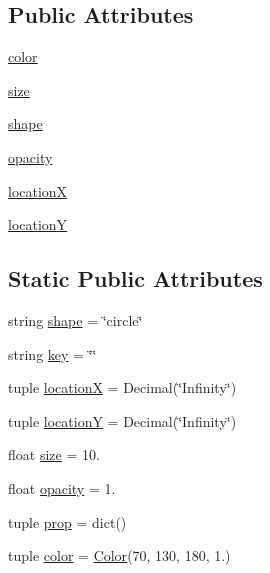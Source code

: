 \subsection*{Public Attributes}
\begin{DoxyCompactItemize}
\item 
\hyperlink{classbridges_1_1element__visualizer_1_1_element_visualizer_a1fd985698e1c56289ed49fa7849d43ab}{color}
\item 
\hyperlink{classbridges_1_1element__visualizer_1_1_element_visualizer_a375c56195d1c86d3a658e923be40cb71}{size}
\item 
\hyperlink{classbridges_1_1element__visualizer_1_1_element_visualizer_ac655e0c61496bf47e2f4205c2ebd103b}{shape}
\item 
\hyperlink{classbridges_1_1element__visualizer_1_1_element_visualizer_a160c08f654cdff1112196debae3f3986}{opacity}
\item 
\hyperlink{classbridges_1_1element__visualizer_1_1_element_visualizer_a354cfdfde667847d9c1eb1da9a845c3d}{location\+X}
\item 
\hyperlink{classbridges_1_1element__visualizer_1_1_element_visualizer_a1e40a89dd4929f695b47b254bb225786}{location\+Y}
\end{DoxyCompactItemize}
\subsection*{Static Public Attributes}
\begin{DoxyCompactItemize}
\item 
string \hyperlink{classbridges_1_1element__visualizer_1_1_element_visualizer_a6db873bf17053c96b54a5ad98763a2c3}{shape} = \char`\"{}circle\char`\"{}
\item 
string \hyperlink{classbridges_1_1element__visualizer_1_1_element_visualizer_add49bfbc846d29a7f09a2369f10efdd1}{key} = \char`\"{}\char`\"{}
\item 
tuple \hyperlink{classbridges_1_1element__visualizer_1_1_element_visualizer_acbd89b4857889f148fe3b2451df7c6cb}{location\+X} = Decimal(\char`\"{}Infinity\char`\"{})
\item 
tuple \hyperlink{classbridges_1_1element__visualizer_1_1_element_visualizer_a3e6b51863d7fb66b77bd344a2aa441d0}{location\+Y} = Decimal(\char`\"{}Infinity\char`\"{})
\item 
float \hyperlink{classbridges_1_1element__visualizer_1_1_element_visualizer_ad8effb64ea33382a723c2c4948048d17}{size} = 10.
\item 
float \hyperlink{classbridges_1_1element__visualizer_1_1_element_visualizer_add8eebf4bece910f0d6899fedd71b139}{opacity} = 1.
\item 
tuple \hyperlink{classbridges_1_1element__visualizer_1_1_element_visualizer_a1cbe6ec67948d7a55b4950c3d5494bb0}{prop} = dict()
\item 
tuple \hyperlink{classbridges_1_1element__visualizer_1_1_element_visualizer_acdc0543d9c0c472597e2ba35ec2acdc4}{color} = \hyperlink{classbridges_1_1color_1_1_color}{Color}(70, 130, 180, 1.)
\end{DoxyCompactItemize}


